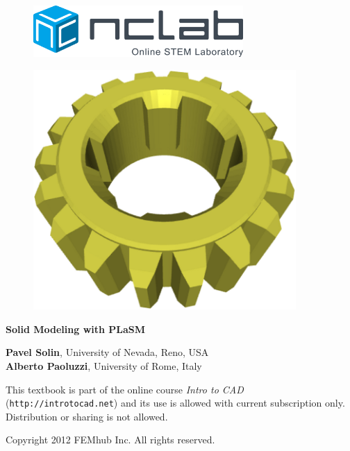 \documentclass{article}
\begin{document}
\large

\vbox{}
\begin{figure}[!ht]
\includegraphics[width=8cm]{img/logo.png}
\vspace{18mm}
\end{figure}

\begin{figure}[!ht]
\begin{center}
\includegraphics[width=10cm]{img/plasm-frontpage.png}
\vspace{16mm}
\end{center}
\end{figure}

\begin{center}
{\Huge \bf Solid Modeling with PLaSM}

\vbox{}
\vspace{1cm}
\vfill
{\large
{\bf Pavel Solin}, University of Nevada, Reno, USA\\
{\bf Alberto Paoluzzi}, University of Rome, Italy
}
\end{center}
\newpage



\vbox{}
\vfill
\begin{center}
{\large
This textbook is part of the online course 
{\em Intro to CAD} 
({\tt http://introtocad.net}) and its use is allowed with current subscription only.
Distribution or sharing is not allowed. \\
}
\vfill

Copyright 2012 FEMhub Inc. All rights reserved.
\end{center}
\end{document}
